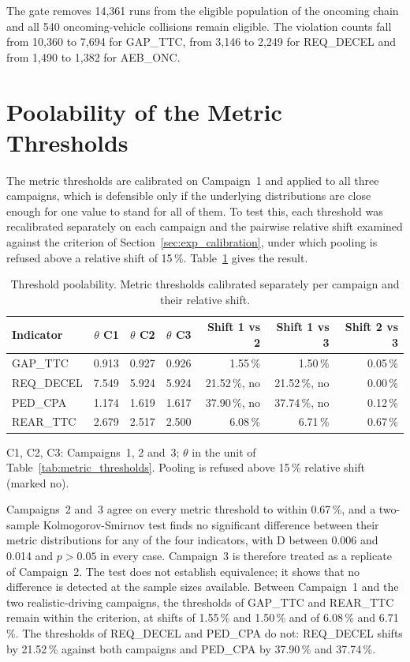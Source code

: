 The gate removes 14,361 runs from the eligible population of the oncoming chain
and all 540 oncoming-vehicle collisions remain eligible. The violation counts
fall from 10,360 to 7,694 for GAP\_TTC, from 3,146 to 2,249 for REQ\_DECEL and
from 1,490 to 1,382 for AEB\_ONC.

\section{Poolability of the Metric Thresholds}
\label{sec:results_poolability}

The metric thresholds are calibrated on Campaign~1 and applied to all three
campaigns, which is defensible only if the underlying distributions are close
enough for one value to stand for all of them. To test this, each threshold was
recalibrated separately on each campaign and the pairwise relative shift
examined against the criterion of Section~\ref{sec:exp_calibration}, under which
pooling is refused above a relative shift of 15\,\%. Table~\ref{tab:poolability}
gives the result.

\begin{table}[htbp]
\centering
\caption[Threshold poolability]{Threshold poolability. Metric thresholds calibrated separately per campaign and their relative shift.}
\label{tab:poolability}
\small
\begin{tabular}{@{}lrrrrrr@{}}
\toprule
{\bfseries Indicator} & {\bfseries $\theta$ C1} & {\bfseries $\theta$ C2} & {\bfseries $\theta$ C3} & {\bfseries Shift 1 vs 2} & {\bfseries Shift 1 vs 3} & {\bfseries Shift 2 vs 3} \\
\midrule
GAP\_TTC & 0.913 & 0.927 & 0.926 & 1.55\,\% & 1.50\,\% & 0.05\,\% \\
REQ\_DECEL & 7.549 & 5.924 & 5.924 & 21.52\,\%, no & 21.52\,\%, no & 0.00\,\% \\
PED\_CPA & 1.174 & 1.619 & 1.617 & 37.90\,\%, no & 37.74\,\%, no & 0.12\,\% \\
REAR\_TTC & 2.679 & 2.517 & 2.500 & 6.08\,\% & 6.71\,\% & 0.67\,\% \\
\bottomrule
\end{tabular}
\par\smallskip\footnotesize\raggedright C1, C2, C3: Campaigns~1, 2 and~3; $\theta$ in the unit of Table~\ref{tab:metric_thresholds}. Pooling is refused above 15\,\% relative shift (marked no).
\end{table}

Campaigns~2 and~3 agree on every metric threshold to within 0.67\,\%, and a
two-sample Kolmogorov-Smirnov test finds no significant difference between their
metric distributions for any of the four indicators, with D between 0.006 and
0.014 and $p > 0.05$ in every case. Campaign~3 is therefore treated as a
replicate of Campaign~2. The test does not establish equivalence; it shows that
no difference is detected at the sample sizes available. Between Campaign~1 and the
two realistic-driving campaigns, the thresholds of GAP\_TTC and REAR\_TTC remain
within the criterion, at shifts of 1.55\,\% and 1.50\,\% and of 6.08\,\% and
6.71\,\%. The thresholds of REQ\_DECEL and PED\_CPA do not: REQ\_DECEL shifts by
21.52\,\% against both campaigns and PED\_CPA by 37.90\,\% and 37.74\,\%.

